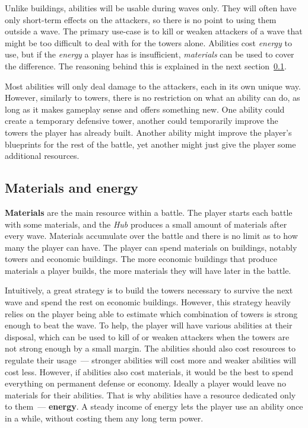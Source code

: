 Unlike buildings, abilities will be usable during waves only.
They will often have only short-term effects on the attackers, so there is no point to using them outside a wave.
The primary use-case is to kill or weaken attackers of a wave that might be too difficult to deal with for the towers alone.
Abilities cost \emph{energy} to use, but if the \emph{energy} a player has is insufficient, \emph{materials} can be used to cover the difference.
The reasoning behind this is explained in the next section~\ref{sec:design-materials-and-energy}.

Most abilities will only deal damage to the attackers, each in its own unique way.
However, similarly to towers, there is no restriction on what an ability can do, as long as it makes gameplay sense and offers something new.
One ability could create a temporary defensive tower, another could temporarily improve the towers the player has already built.
Another ability might improve the player's blueprints for the rest of the battle, yet another might just give the player some additional resources.

\subsection{Materials and energy}\label{sec:design-materials-and-energy}

\textbf{Materials} are the main resource within a battle.
The player starts each battle with some materials, and the \emph{Hub} produces a small amount of materials after every wave.
Materials accumulate over the battle and there is no limit as to how many the player can have.
The player can spend materials on buildings, notably towers and economic buildings.
The more economic buildings that produce materials a player builds, the more materials they will have later in the battle.

Intuitively, a great strategy is to build the towers necessary to survive the next wave and spend the rest on economic buildings.
However, this strategy heavily relies on the player being able to estimate which combination of towers is strong enough to beat the wave.
To help, the player will have various abilities at their disposal, which can be used to kill of or weaken attackers when the towers are not strong enough by a small margin.
The abilities should also cost resources to regulate their usage~--- stronger abilities will cost more and weaker abilities will cost less.
However, if abilities also cost materials, it would be the best to spend everything on permanent defense or economy.
Ideally a player would leave no materials for their abilities.
That is why abilities have a resource dedicated only to them~--- \textbf{energy}.
A steady income of energy lets the player use an ability once in a while, without costing them any long term power.

